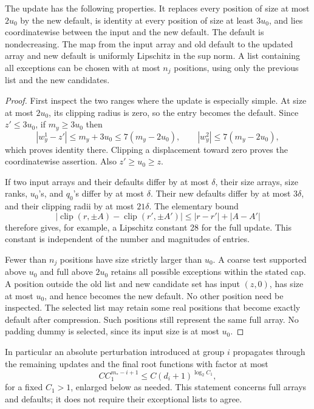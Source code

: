 \begin{lemma}
\label{lem:buf-update}
The update has the following properties.
It replaces every position of size at most $2u_0$ by the new default, is
identity at every position of size at least $3u_0$, and lies coordinatewise
between the input and the new default.  The default is nondecreasing.
The map from the input array and old default to the updated array and new
default is uniformly Lipschitz in the sup norm.  A list containing all
exceptions can be chosen with at most $n_j$ positions, using only the
previous list and the new candidates.
\end{lemma}
\begin{proof}
First inspect the two ranges where the update is especially simple. At size at most $2u_0$, its clipping radius is zero, so the entry becomes the default.  Since $z'\leq3u_0$, if $m_y\geq3u_0$
then
\[
 |w_y^1-z'|\leq m_y+3u_0\leq7(m_y-2u_0),
 \qquad |w_y^2|\leq7(m_y-2u_0),
\]
which proves identity there.  Clipping a displacement toward zero proves
the coordinatewise assertion.  Also $z'\geq u_0\geq z$.

If two input arrays and their defaults differ by at most $\delta$, their
size arrays, size ranks, $u_0$'s, and $q_0$'s differ by at most $\delta$.
Their new defaults differ by at most $3\delta$, and their clipping radii
by at most $21\delta$.  The elementary bound
\[
 |\operatorname{clip}(r,\pm A)-\operatorname{clip}(r',\pm A')|
       \leq |r-r'|+|A-A'|
\]
therefore gives, for example, a Lipschitz constant 28 for the full update.
This constant is independent of the number and magnitudes of entries.

Fewer than $n_j$ positions have size strictly larger than $u_0$.
A coarse test supported above $u_0$ and full above $2u_0$ retains all
possible exceptions within the stated cap.  A position outside the old
list and new candidate set has input $(z,0)$, has size at most $u_0$,
and hence becomes the new default.  No other position need be inspected.
The selected list may retain some real positions that become exactly
default after compression.  Such positions still represent the same
full array.  No padding dummy is selected, since its input size is at
most $u_0$.
\end{proof}

In particular an absolute perturbation introduced at group $i$ propagates
through the remaining updates and the final root functions with factor
at most
\begin{equation}
 C C_1^{m_*-i+1}
       \leq C(d_i+1)^{\log_2 C_1},
 \label{eq:buf-propagation}
\end{equation}
for a fixed $C_1>1$, enlarged below as needed.  This statement concerns
full arrays and defaults; it does not require their exceptional lists to
agree.


